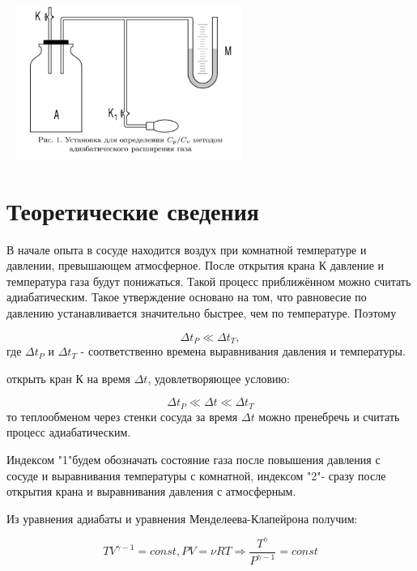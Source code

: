 \documentclass[15pt,a5paper,reqno]{article}
\begin{document}
	\begin{center}
	    \includegraphics[width = 8cm, height = 5cm]{Рис. 1, Установка.png}
	\end{center}

\section{Теоретические сведения}

    В начале опыта в сосуде находится воздух при комнатной температуре и давлении, превышающем атмосферное. После открытия крана К давление и температура газа будут понижаться. Такой процесс приближённом можно считать адиабатическим. Такое утверждение основано на том, что равновесие по давлению устанавливается значительно быстрее, чем по температуре. Поэтому
    
    \begin{equation}
        \Delta t_P \ll \Delta t_T,
    \end{equation}
    где $\Delta t_P$ и $\Delta t_T$ - соответственно времена выравнивания давления и температуры. 
    
     открыть кран К на время $\Delta t$, удовлетворяющее условию:
    
    \begin{equation}
        \Delta t_P \ll \Delta t \ll \Delta t_T
    \end{equation}
	то теплообменом через стенки сосуда за время $\Delta t$ можно пренебречь и считать процесс адиабатическим.
	
	Индексом "1"\>будем обозначать состояние газа после повышения давления с сосуде и выравнивания температуры  с комнатной, индексом "2"\>- сразу после открытия крана и выравнивания давления с атмосферным.
	
	Из уравнения адиабаты и уравнения Менделеева-Клапейрона получим:
	
	\begin{equation}
	    TV^{\gamma - 1} = const, PV = \nu RT \Rightarrow \frac{T^{\gamma}}{P^{\gamma - 1}} = const
	\end{equation}
	
\end{document}
